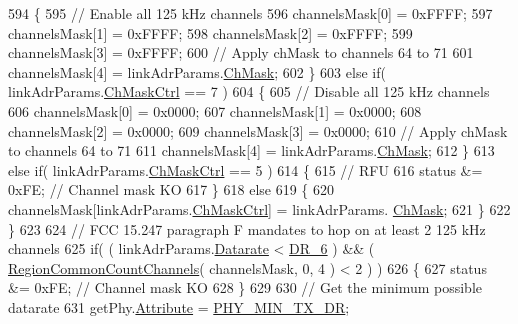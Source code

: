 \begin{DoxyCode}
594         \{
595             \textcolor{comment}{// Enable all 125 kHz channels}
596             channelsMask[0] = 0xFFFF;
597             channelsMask[1] = 0xFFFF;
598             channelsMask[2] = 0xFFFF;
599             channelsMask[3] = 0xFFFF;
600             \textcolor{comment}{// Apply chMask to channels 64 to 71}
601             channelsMask[4] = linkAdrParams.\mbox{\hyperlink{structs_region_common_link_adr_params_adb3d38c312a46e617b1319f97dd56a87}{ChMask}};
602         \}
603         \textcolor{keywordflow}{else} \textcolor{keywordflow}{if}( linkAdrParams.\mbox{\hyperlink{structs_region_common_link_adr_params_ac5e1891f30a172b2ce39bc3498e1843d}{ChMaskCtrl}} == 7 )
604         \{
605             \textcolor{comment}{// Disable all 125 kHz channels}
606             channelsMask[0] = 0x0000;
607             channelsMask[1] = 0x0000;
608             channelsMask[2] = 0x0000;
609             channelsMask[3] = 0x0000;
610             \textcolor{comment}{// Apply chMask to channels 64 to 71}
611             channelsMask[4] = linkAdrParams.\mbox{\hyperlink{structs_region_common_link_adr_params_adb3d38c312a46e617b1319f97dd56a87}{ChMask}};
612         \}
613         \textcolor{keywordflow}{else} \textcolor{keywordflow}{if}( linkAdrParams.\mbox{\hyperlink{structs_region_common_link_adr_params_ac5e1891f30a172b2ce39bc3498e1843d}{ChMaskCtrl}} == 5 )
614         \{
615             \textcolor{comment}{// RFU}
616             status &= 0xFE; \textcolor{comment}{// Channel mask KO}
617         \}
618         \textcolor{keywordflow}{else}
619         \{
620             channelsMask[linkAdrParams.\mbox{\hyperlink{structs_region_common_link_adr_params_ac5e1891f30a172b2ce39bc3498e1843d}{ChMaskCtrl}}] = linkAdrParams.
      \mbox{\hyperlink{structs_region_common_link_adr_params_adb3d38c312a46e617b1319f97dd56a87}{ChMask}};
621         \}
622     \}
623 
624     \textcolor{comment}{// FCC 15.247 paragraph F mandates to hop on at least 2 125 kHz channels}
625     \textcolor{keywordflow}{if}( ( linkAdrParams.\mbox{\hyperlink{structs_region_common_link_adr_params_ae2f6080f3aa0e9485c55513ca56bb24d}{Datarate}} < \mbox{\hyperlink{group___r_e_g_i_o_n_ga8e2b4c15b7dbb8bda5ed635ca1d262be}{DR\_6}} ) && ( 
      \mbox{\hyperlink{group___r_e_g_i_o_n_c_o_m_m_o_n_gac23f0831812f610f57f42f6cf87368c9}{RegionCommonCountChannels}}( channelsMask, 0, 4 ) < 2 ) )
626     \{
627         status &= 0xFE; \textcolor{comment}{// Channel mask KO}
628     \}
629 
630     \textcolor{comment}{// Get the minimum possible datarate}
631     getPhy.\mbox{\hyperlink{structs_get_phy_params_abdcb168ffd6913b85e2f635d7a475f2d}{Attribute}} = \mbox{\hyperlink{group___r_e_g_i_o_n_gga51cbe8f5433d914fe9cf81b451de2c2daace3e56c88b40def8ed6a9106871e7de}{PHY\_MIN\_TX\_DR}};

\end{DoxyCode}
